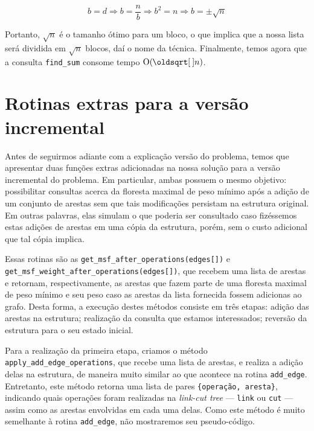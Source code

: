 \begin{equation}
    b = d \Rightarrow
    b = \frac{n}{b} \Rightarrow
    b^2 = n \Rightarrow
    b = \pm \sqrt{n}
\end{equation}

Portanto, $\sqrt{n}$ é o tamanho ótimo para um bloco, o que implica que a nossa lista será dividida em $\sqrt{n}$ blocos, daí o nome da técnica. Finalmente, temos agora que a consulta \texttt{find\_sum} consome tempo $\Oh(\sqrt{n})$.

\section{Rotinas extras para a versão incremental}
\label{sec:imsf-extras}

Antes de seguirmos adiante com a explicação versão do problema, temos que apresentar duas funções extras adicionadas na nossa solução para a versão incremental do problema. Em particular, ambas possuem o mesmo objetivo: possibilitar consultas acerca da floresta maximal de peso mínimo após a adição de um conjunto de arestas sem que tais modificações persistam na estrutura original. Em outras palavras, elas simulam o que poderia ser consultado caso fizéssemos estas adições de arestas em uma cópia da estrutura, porém, sem o custo adicional que tal cópia implica.

Essas rotinas são as \texttt{get\_msf\_after\_operations(edges[])} e \texttt{get\_msf\_weight\_after\_operations(edges[])}, que recebem uma lista de arestas e retornam, respectivamente, as arestas que fazem parte de uma floresta maximal de peso mínimo e seu peso caso as arestas da lista fornecida fossem adicionas ao grafo. Desta forma, a execução destes métodos consiste em três etapas: adição das arestas na estrutura; realização da consulta que estamos interessados; reversão da estrutura para o seu estado inicial.

Para a realização da primeira etapa, criamos o método \texttt{apply\_add\_edge\_operations}, que recebe uma lista de arestas, e realiza a adição delas na estrutura, de maneira muito similar ao que acontece na rotina \texttt{add\_edge}. Entretanto, este método retorna uma lista de pares \texttt{\{operação, aresta\}}, indicando quais operações foram realizadas na \emph{link-cut tree} --- \texttt{link} ou \texttt{cut} --- assim como as arestas envolvidas em cada uma delas. Como este método é muito semelhante à rotina \texttt{add\_edge}, não mostraremos seu pseudo-código.

